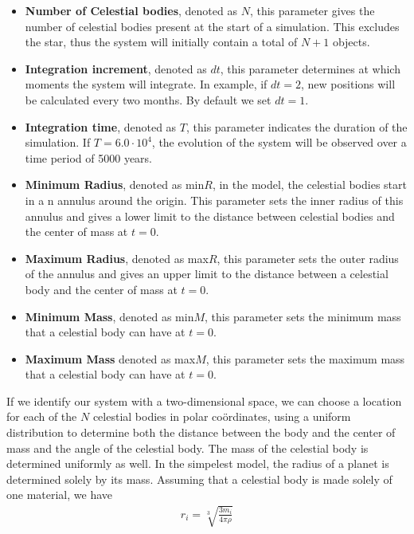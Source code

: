 \begin{itemize}
	\item \textbf{Number of Celestial bodies}, denoted as \(N\), this parameter gives the number of celestial bodies present at the start of a simulation. This excludes the star, thus the system will initially contain a total of \(N+1\) objects.
	\item \textbf{Integration increment}, denoted as \(dt\), this parameter determines at which moments the system will integrate. In example, if \(dt=2\), new positions will be calculated every two months. By default we set \(dt=1\).
	\item \textbf{Integration time}, denoted as \(T\), this parameter indicates the duration of the simulation. If \(T=6.0\cdot10^4\), the evolution of the system will be observed over a time period of 5000 years.
	\item \textbf{Minimum Radius}, denoted as min\(R\), in the model, the celestial bodies start in a n annulus around the origin. This parameter sets the inner radius of this annulus and gives a lower limit to the distance between celestial bodies and the center of mass at \(t=0\).
	\item \textbf{Maximum Radius}, denoted as max\(R\), this parameter sets the outer radius of the annulus and gives an upper limit to the distance between a celestial body and the center of mass at \(t=0\).
	\item \textbf{Minimum Mass}, denoted as min\(M\), this parameter sets the minimum mass that a celestial body can have at \(t=0\).
	\item \textbf{Maximum Mass} denoted as max\(M\), this parameter sets the maximum mass that a celestial body can have at \(t=0\).
\end{itemize}
If we identify our system with a two-dimensional space, we can choose a location for each of the \(N\) celestial bodies in polar co\"ordinates, using a uniform distribution to determine both the distance between the body and the center of mass and the angle of the celestial body. 
The mass of the celestial body is determined uniformly as well. In the simpelest model, the radius of a planet is determined solely by its mass. Assuming that a celestial body is made solely of one material, we have
\begin{align}
r_i=\sqrt[3]{\frac{3 m_i}{4\pi \rho}}\label{eq:rad}
\end{align}
